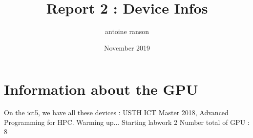 \documentclass{article}
\title{Report 2 : Device Infos}
\author{antoine ranson }
\date{November 2019}
\begin{document}
 
\maketitle 

\section{Information about the GPU} 
On the ict5, we have all these devices : \newline 
USTH ICT Master 2018, Advanced Programming for HPC.\newline 
Warming up...\newline 
Starting labwork 2\newline 
Number total of GPU : 8 \newline\newline 
\end{document}
